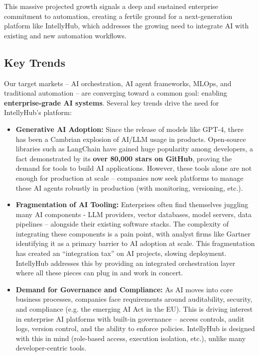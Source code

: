 \documentclass[11pt, a4paper, oneside]{article}
\begin{document}
This massive projected growth signals a deep and sustained enterprise commitment to automation, creating a fertile ground for a next-generation platform like IntellyHub, which addresses the growing need to integrate AI with existing and new automation workflows.

\subsection{Key Trends}
Our target markets – AI orchestration, AI agent frameworks, MLOps, and traditional automation – are converging toward a common goal: enabling \textbf{enterprise-grade AI systems}. Several key trends drive the need for IntellyHub's platform:

\begin{itemize}
    \item \textbf{Generative AI Adoption:} Since the release of models like GPT-4, there has been a Cambrian explosion of AI/LLM usage in products. Open-source libraries such as LangChain have gained huge popularity among developers, a fact demonstrated by its \textbf{over 80,000 stars on GitHub}\cite{langchainGitHub}, proving the demand for tools to build AI applications. However, these tools alone are not enough for production at scale – companies now seek platforms to manage these AI agents robustly in production (with monitoring, versioning, etc.). 
    
    \item \textbf{Fragmentation of AI Tooling:} Enterprises often find themselves juggling many AI components - LLM providers, vector databases, model servers, data pipelines – alongside their existing software stacks. The complexity of integrating these components is a pain point, with analyst firms like Gartner identifying it as a primary barrier to AI adoption at scale\cite{gartnerAIBarriers}. This fragmentation has created an “integration tax” on AI projects, slowing deployment. IntellyHub addresses this by providing an integrated orchestration layer where all these pieces can plug in and work in concert.
    
    \item \textbf{Demand for Governance and Compliance:} As AI moves into core business processes, companies face requirements around auditability, security, and compliance (e.g. the emerging AI Act in the EU\cite{euAIAct}). This is driving interest in enterprise AI platforms with built-in governance – access controls, audit logs, version control, and the ability to enforce policies. IntellyHub is designed with this in mind (role-based access, execution isolation, etc.), unlike many developer-centric tools.
    

\end{itemize}
\end{document}
